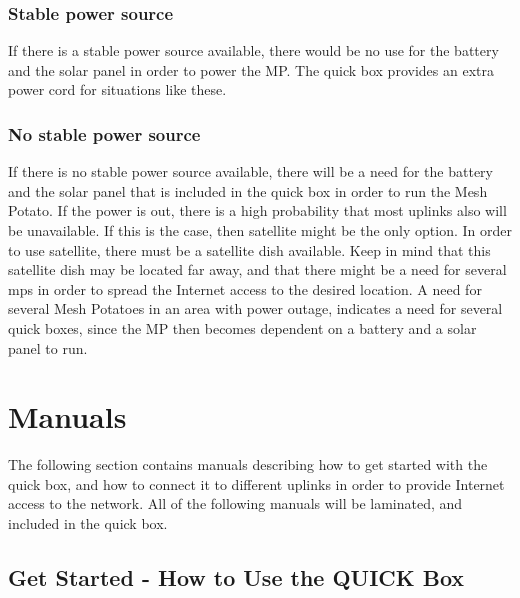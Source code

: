 \subsubsection{Stable power source}
If there is a stable power source available, there would be no use for the battery and the solar panel in order to power the MP. The \gls{quick} box provides an extra power cord for situations like these. 

\subsubsection{No stable power source}
If there is no stable power source available, there will be a need for the battery and the solar panel that is included in the \gls{quick} box in order to run the Mesh Potato. If the power is out, there is a high probability that most uplinks also will be unavailable. If this is the case, then satellite might be the only option. In order to use satellite, there must be a satellite dish available. Keep in mind that this satellite dish may be located far away, and that there might be a need for several \glspl{mp} in order to spread the Internet access to the desired location. A need for several Mesh Potatoes in an area with power outage, indicates a need for several \gls{quick} boxes, since the MP then becomes dependent on a battery and a solar panel to run. 


\section{Manuals}
The following section contains manuals describing how to get started with the \gls{quick} box, and how to connect it to different uplinks in order to provide Internet access to the network. All of the following manuals will be laminated, and included in the \gls{quick} box. 
\clearpage
\subsection{Get Started - How to Use the QUICK Box}

\clearpage
